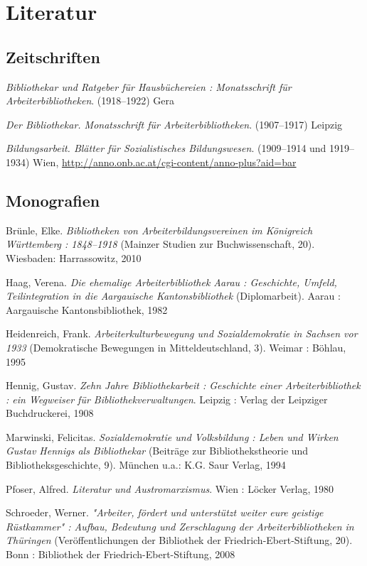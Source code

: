 \documentclass[a4paper,
fontsize=11pt,
oneside,
numbers=noperiodatend,
parskip=half-,
bibliography=totoc,
final
]{scrartcl}
\begin{document}
\hypertarget{literatur}{%
\section*{Literatur}\label{literatur}}

\hypertarget{zeitschriften}{%
\subsection*{Zeitschriften}\label{zeitschriften}}

\emph{Bibliothekar und Ratgeber für Hausbüchereien : Monatsschrift für
Arbeiterbibliotheken}. (1918--1922) Gera

\emph{Der Bibliothekar. Monatsschrift für Arbeiterbibliotheken}.
(1907--1917) Leipzig

\emph{Bildungsarbeit. Blätter für Sozialistisches Bildungswesen}.
(1909--1914 und 1919--1934) Wien,
\url{http://anno.onb.ac.at/cgi-content/anno-plus?aid=bar}

\hypertarget{monografien}{%
\subsection*{Monografien}\label{monografien}}

Brünle, Elke. \emph{Bibliotheken von Arbeiterbildungsvereinen im
Königreich Württemberg : 1848--1918} (Mainzer Studien zur
Buchwissenschaft, 20). Wiesbaden: Harrassowitz, 2010

Haag, Verena. \emph{Die ehemalige Arbeiterbibliothek Aarau : Geschichte,
Umfeld, Teilintegration in die Aargauische Kantonsbibliothek}
(Diplomarbeit). Aarau : Aargauische Kantonsbibliothek, 1982

Heidenreich, Frank. \emph{Arbeiterkulturbewegung und Sozialdemokratie in
Sachsen vor 1933} (Demokratische Bewegungen in Mitteldeutschland, 3).
Weimar : Böhlau, 1995

Hennig, Gustav. \emph{Zehn Jahre Bibliothekarbeit : Geschichte einer
Arbeiterbibliothek : ein Wegweiser für Bibliothekverwaltungen}. Leipzig
: Verlag der Leipziger Buchdruckerei, 1908

Marwinski, Felicitas. \emph{Sozialdemokratie und Volksbildung : Leben
und Wirken Gustav Hennigs als Bibliothekar} (Beiträge zur
Bibliothekstheorie und Bibliotheksgeschichte, 9). München u.a.: K.G.
Saur Verlag, 1994

Pfoser, Alfred. \emph{Literatur und Austromarxismus}. Wien : Löcker
Verlag, 1980

Schroeder, Werner. \emph{"Arbeiter, fördert und unterstützt weiter eure
geistige Rüstkammer" : Aufbau, Bedeutung und Zerschlagung der
Arbeiterbibliotheken in Thüringen} (Veröffentlichungen der Bibliothek
der Friedrich-Ebert-Stiftung, 20). Bonn : Bibliothek der
Friedrich-Ebert-Stiftung, 2008
\end{document}
